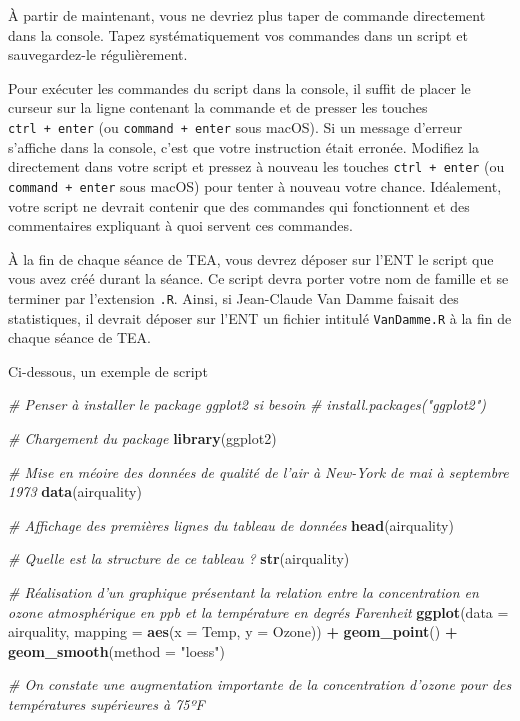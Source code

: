 \documentclass[a4paperpaper,]{article}
\newenvironment{Shaded}{\begin{snugshade}}{\end{snugshade}}
\newcommand{\KeywordTok}[1]{\textcolor[rgb]{0.13,0.29,0.53}{\textbf{#1}}}
\newcommand{\DataTypeTok}[1]{\textcolor[rgb]{0.13,0.29,0.53}{#1}}
\newcommand{\StringTok}[1]{\textcolor[rgb]{0.31,0.60,0.02}{#1}}
\newcommand{\CommentTok}[1]{\textcolor[rgb]{0.56,0.35,0.01}{\textit{#1}}}
\newcommand{\OperatorTok}[1]{\textcolor[rgb]{0.81,0.36,0.00}{\textbf{#1}}}
\newcommand{\NormalTok}[1]{#1}
\theoremstyle{definition}
\theoremstyle{definition}
\theoremstyle{definition}
\theoremstyle{remark}
\begin{document}
À partir de maintenant, vous ne devriez plus taper de commande
directement dans la console. Tapez systématiquement vos commandes dans
un script et sauvegardez-le régulièrement.

Pour exécuter les commandes du script dans la console, il suffit de
placer le curseur sur la ligne contenant la commande et de presser les
touches \texttt{ctrl\ +\ enter} (ou \texttt{command\ +\ enter} sous
macOS). Si un message d'erreur s'affiche dans la console, c'est que
votre instruction était erronée. Modifiez la directement dans votre
script et pressez à nouveau les touches \texttt{ctrl\ +\ enter} (ou
\texttt{command\ +\ enter} sous macOS) pour tenter à nouveau votre
chance. Idéalement, votre script ne devrait contenir que des commandes
qui fonctionnent et des commentaires expliquant à quoi servent ces
commandes.

À la fin de chaque séance de TEA, vous devrez déposer sur l'ENT le
script que vous avez créé durant la séance. Ce script devra porter votre
nom de famille et se terminer par l'extension \texttt{.R}. Ainsi, si
Jean-Claude Van Damme faisait des statistiques, il devrait déposer sur
l'ENT un fichier intitulé \texttt{VanDamme.R} à la fin de chaque séance
de TEA.

Ci-dessous, un exemple de script

\begin{Shaded}
\begin{Highlighting}[]
\CommentTok{# Penser à installer le package ggplot2 si besoin}
\CommentTok{# install.packages("ggplot2")}

\CommentTok{# Chargement du package}
\KeywordTok{library}\NormalTok{(ggplot2)}

\CommentTok{# Mise en méoire des données de qualité de l'air à New-York de mai à septembre 1973}
\KeywordTok{data}\NormalTok{(airquality)}

\CommentTok{# Affichage des premières lignes du tableau de données}
\KeywordTok{head}\NormalTok{(airquality)}

\CommentTok{# Quelle est la structure de ce tableau ?}
\KeywordTok{str}\NormalTok{(airquality)}

\CommentTok{# Réalisation d'un graphique présentant la relation entre la concentration en ozone atmosphérique en ppb et la température en degrés Farenheit}
\KeywordTok{ggplot}\NormalTok{(}\DataTypeTok{data =}\NormalTok{ airquality, }\DataTypeTok{mapping =} \KeywordTok{aes}\NormalTok{(}\DataTypeTok{x =}\NormalTok{ Temp, }\DataTypeTok{y =}\NormalTok{ Ozone)) }\OperatorTok{+}
\StringTok{  }\KeywordTok{geom_point}\NormalTok{() }\OperatorTok{+}
\StringTok{  }\KeywordTok{geom_smooth}\NormalTok{(}\DataTypeTok{method =} \StringTok{"loess"}\NormalTok{)}

\CommentTok{# On constate une augmentation importante de la concentration d'ozone pour des températures supérieures à 75ºF}
\end{Highlighting}
\end{Shaded}
\end{document}
